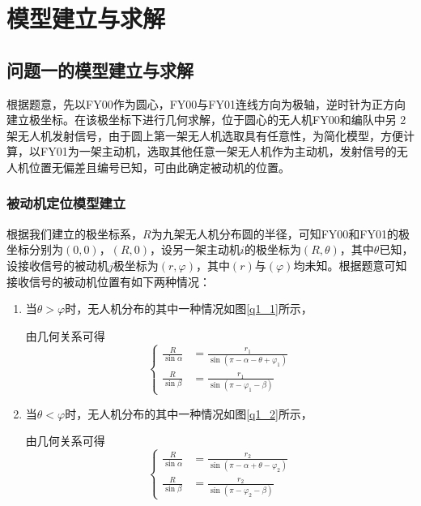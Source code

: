 \documentclass[withoutpreface,bwprint]{cumcmthesis} %
\begin{document}
\section{模型建立与求解}
\subsection{问题一的模型建立与求解}


根据题意，先以FY00作为圆心，FY00与FY01连线方向为极轴，逆时针为正方向建立极坐标。在该极坐标下进行几何求解，位于圆心的无人机FY00和编队中另 2 架无人机发射信号，由于圆上第一架无人机选取具有任意性，为简化模型，方便计算，以FY01为一架主动机，选取其他任意一架无人机作为主动机，发射信号的无人机位置无偏差且编号已知，可由此确定被动机的位置。

\subsubsection{被动机定位模型建立}

根据我们建立的极坐标系，$R$为九架无人机分布圆的半径，可知FY00和FY01的极坐标分别为$(0,0)$，$(R,0)$，设另一架主动机$i$的极坐标为$(R,\theta)$，其中$\theta$已知，设接收信号的被动机$j$极坐标为$(r,\varphi)$，其中$(r)$与$(\varphi)$均未知。根据题意可知接收信号的被动机位置有如下两种情况：

\begin{enumerate}
    \item 当$\theta>\varphi$时，无人机分布的其中一种情况如图\ref{q1_1}所示，

    由几何关系可得
    \begin{equation}
    \left\{
    \begin{aligned}
        \frac{R}{\sin\alpha} &= \frac{r_1}{\sin(\pi - \alpha - \theta + \varphi_1)} \\
        \frac{R}{\sin\beta} &= \frac{r_1}{\sin(\pi - \varphi_1 - \beta)}
    \end{aligned}
    \right.
    \label{式1}
    \end{equation}

    \item 当$\theta<\varphi$时，无人机分布的其中一种情况如图\ref{q1_2}所示，
    
    由几何关系可得
    \begin{equation}
    \left\{
        \begin{aligned}
            \frac{R}{\sin\alpha} &= \frac{r_2}{\sin(\pi - \alpha + \theta - \varphi_2)} \\
            \frac{R}{\sin\beta} &= \frac{r_2}{\sin(\pi - \varphi_2 - \beta)}
        \end{aligned}
    \right.
    \label{式2}
    \end{equation}
    
\end{enumerate}
\end{document}
